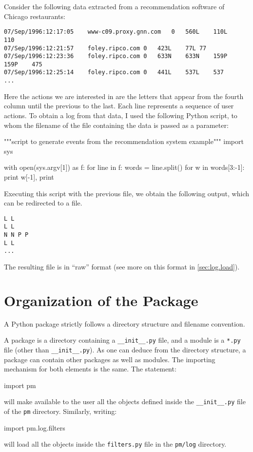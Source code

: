 \documentclass[a4paper,10pt]{book}
\begin{document}
Consider the following data extracted from a recommendation software of Chicago restaurants:
\begin{verbatim}
07/Sep/1996:12:17:05 	www-c09.proxy.gnn.com	0	560L	110L	110
07/Sep/1996:12:21:57 	foley.ripco.com	0	423L	77L	77
07/Sep/1996:12:23:36 	foley.ripco.com	0	633N	633N	159P	159P	475
07/Sep/1996:12:25:14 	foley.ripco.com	0	441L	537L	537
...
\end{verbatim}
Here the actions we are interested in are the letters that appear from the fourth column until the previous to the last. Each line represents a sequence of user actions. To obtain a log from that data, I used the following Python script, to whom the filename of the file containing the data is passed as a parameter:
\begin{pycode}
"""script to generate events from the recommendation system example"""
import sys

with open(sys.argv[1]) as f:
    for line in f:
	words = line.split()
	for w in words[3:-1]:
	    print w[-1],
	print
\end{pycode}

Executing this script with the previous file, we obtain the following output, which can be redirected to a file. 
\begin{verbatim}
L L
L L
N N P P
L L
...
\end{verbatim}
The resulting file is in ``raw'' format (see more on this format in \ref{sec:log.load}).

\section{Organization of the Package}

A Python package strictly follows a directory structure and filename convention.

A package is a directory containing a \texttt{\_\_init\_\_.py} file, and a module is a \texttt{*.py} file (other than \texttt{\_\_init\_\_.py}). As one can deduce from the directory structure, a package can contain other packages as well as modules. The importing mechanism for both elements is the same. The statement:\\
\begin{pycode}
import pm
\end{pycode}
will make available to the user all the objects defined inside the \texttt{\_\_init\_\_.py} file of the \texttt{pm} directory. Similarly, writing:\\
\begin{pycode}
import pm.log.filters
\end{pycode}
will load all the objects inside the \texttt{filters.py} file in the \texttt{pm/log} directory.
\end{document}
